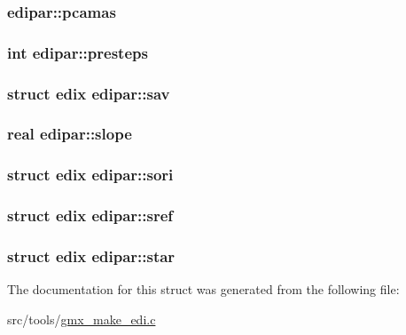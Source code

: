 \hypertarget{structedipar_a8a2f2a0f0a8789abe0f812f78c844fb0}{
\subsubsection[{pcamas}]{ {\bf edipar\-::pcamas}}}\label{structedipar_a8a2f2a0f0a8789abe0f812f78c844fb0}
\hypertarget{structedipar_a3cc5c66d1ed5e098ce83face78f5608d}{
\subsubsection[{presteps}]{\setlength{\rightskip}{0pt plus 5cm}int {\bf edipar\-::presteps}}}\label{structedipar_a3cc5c66d1ed5e098ce83face78f5608d}
\hypertarget{structedipar_a1dd26fec1057334ce697a6e8578d1a1c}{
\subsubsection[{sav}]{\setlength{\rightskip}{0pt plus 5cm}struct {\bf edix} {\bf edipar\-::sav}}}\label{structedipar_a1dd26fec1057334ce697a6e8578d1a1c}
\hypertarget{structedipar_a5c51b812eefa1f9ce0698ae0553e3c6c}{
\subsubsection[{slope}]{\setlength{\rightskip}{0pt plus 5cm}real {\bf edipar\-::slope}}}\label{structedipar_a5c51b812eefa1f9ce0698ae0553e3c6c}
\hypertarget{structedipar_acececcf13dbb1e7e87d34a4538eb48dd}{
\subsubsection[{sori}]{\setlength{\rightskip}{0pt plus 5cm}struct {\bf edix} {\bf edipar\-::sori}}}\label{structedipar_acececcf13dbb1e7e87d34a4538eb48dd}
\hypertarget{structedipar_a3e5e5657da77e6acec2be3f4de7e5371}{
\subsubsection[{sref}]{\setlength{\rightskip}{0pt plus 5cm}struct {\bf edix} {\bf edipar\-::sref}}}\label{structedipar_a3e5e5657da77e6acec2be3f4de7e5371}
\hypertarget{structedipar_a17b403d270fabf0b56901dc27c97cf8b}{
\subsubsection[{star}]{\setlength{\rightskip}{0pt plus 5cm}struct {\bf edix} {\bf edipar\-::star}}}\label{structedipar_a17b403d270fabf0b56901dc27c97cf8b}


\-The documentation for this struct was generated from the following file\-:\begin{DoxyCompactItemize}
\item 
src/tools/\hyperlink{gmx__make__edi_8c}{gmx\-\_\-make\-\_\-edi.\-c}\end{DoxyCompactItemize}
